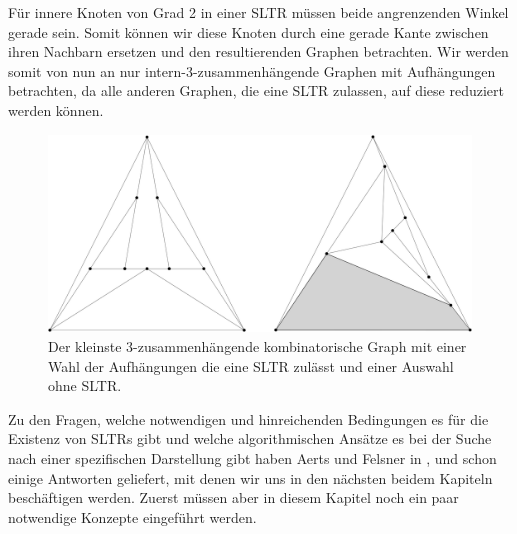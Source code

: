 \begin{remark}
Für innere Knoten von Grad 2 in einer SLTR müssen beide angrenzenden Winkel gerade sein. Somit können wir diese Knoten durch eine gerade Kante zwischen ihren Nachbarn ersetzen und den resultierenden Graphen betrachten. Wir werden somit von nun an nur intern-3-zusammenhängende Graphen mit Aufhängungen betrachten, da alle anderen Graphen, die eine SLTR zulassen, auf diese reduziert werden können.
\end{remark}

\begin{figure}[h]
	\centering
  \includegraphics[scale=0.1]{10_example.png}
	\caption{Der kleinste 3-zusammenhängende kombinatorische Graph mit einer Wahl der Aufhängungen die eine SLTR zulässt und einer Auswahl ohne SLTR.}
	\label{10_example}
\end{figure}

Zu den Fragen, welche notwendigen und hinreichenden Bedingungen es für die Existenz von SLTRs gibt und  welche algorithmischen Ansätze es bei der Suche nach einer spezifischen Darstellung gibt haben Aerts und Felsner in \cite{af13}, \cite{af13h} und \cite{af15} schon einige Antworten geliefert, mit denen wir uns in den nächsten beidem Kapiteln beschäftigen werden. Zuerst müssen aber in diesem Kapitel noch ein paar notwendige Konzepte eingeführt werden.
